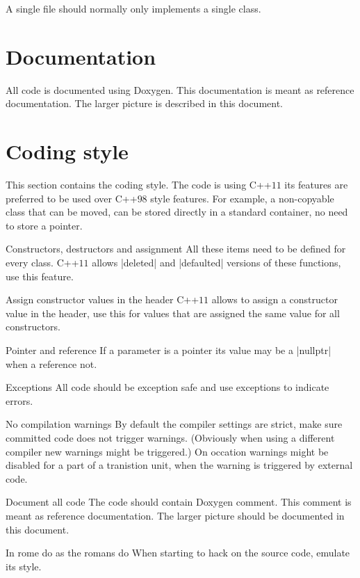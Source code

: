 A single file should normally only implements a single class.


\section{Documentation}

All code is documented using Doxygen. This documentation is meant as
reference documentation. The larger picture is described in this document.


\section{Coding style}

This section contains the coding style. The code is using \mbox{C++$11$} its
features are preferred to be used over \mbox{C++$98$} style features. For
example, a non-copyable class that can be moved, can be stored directly in a
standard container, no need to store a pointer.

\begin{description}
\item{Constructors, destructors and assignment}
	All these items need to be defined for every class. \mbox{C++$11$}
	allows \command|deleted| and \command|defaulted| versions of these
	functions, use this feature.

\item{Assign constructor values in the header}
	\mbox{C++$11$} allows to assign a constructor value in the header, use
	this for values that are assigned the same value for all constructors.

\item{Pointer and reference}
	If a parameter is a pointer its value may be a \command|nullptr| when a
	reference not.

\item{Exceptions}
	All code should be exception safe and use exceptions to indicate
	errors.

\item{No compilation warnings}
	By default the compiler settings are strict, make sure committed code
	does not trigger warnings. (Obviously when using a different compiler
	new warnings might be triggered.) On occation warnings might be disabled
	for a part of a tranistion unit, when the warning is triggered by
	external code.

\item{Document all code}
	The code should contain Doxygen comment. This comment is meant as
	reference documentation. The larger picture should be documented in this
	document.

\item{In rome do as the romans do}
	When starting to hack on the source code, emulate its style.

\end{description}
